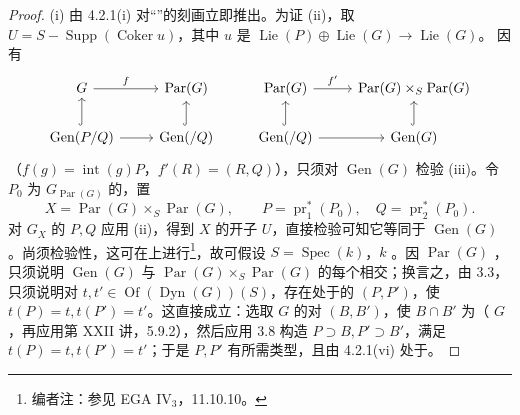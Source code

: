\begin{proof}
(i) 由 4.2.1(i) 对“”的刻画立即推出。为证 (ii)，取 $U=S-\operatorname{Supp}(\operatorname{Coker}u)$，其中 $u$ 是 $\operatorname{Lie}(P)\oplus\operatorname{Lie}(G)\to\operatorname{Lie}(G)$。
因有
\[\begin{tikzcd}
G\arrow[r,"f"]&\operatorname{Par}(G)&\operatorname{Par}(G)\arrow[r,"f'"]&\operatorname{Par}(G)\times_S\operatorname{Par}(G)\\
\operatorname{Gen}(P/Q)\arrow[u,hook]\arrow[r]&\operatorname{Gen}(/Q)\arrow[u,hook]&\operatorname{Gen}(/Q)\arrow[u,hook]\arrow[r]&\operatorname{Gen}(G)\arrow[u,hook]
\end{tikzcd}\]
（$f(g)=\operatorname{int}(g)P$，$f'(R)=(R,Q)$），只须对 $\operatorname{Gen}(G)$ 检验 (iii)。令 $P_0$ 为 $G_{\operatorname{Par}(G)}$ 的，置
\[X=\operatorname{Par}(G)\times_S\operatorname{Par}(G),\qquad P=\operatorname{pr}_1^*(P_0),\quad Q=\operatorname{pr}_2^*(P_0).\]
对 $G_X$ 的 $P,Q$ 应用 (ii)，得到 $X$ 的开子 $U$，直接检验可知它等同于 $\operatorname{Gen}(G)$。尚须检验性，这可在上进行\footnote{编者注：参见 EGA IV$_3$，11.10.10。}，故可假设 $S=\operatorname{Spec}(k)$，$k$ 。因 $\operatorname{Par}(G)$ ，只须说明 $\operatorname{Gen}(G)$ 与 $\operatorname{Par}(G)\times_S\operatorname{Par}(G)$ 的每个相交；换言之，由 3.3，只须说明对 $t,t'\in\operatorname{Of}(\operatorname{Dyn}(G))(S)$，存在处于的 $(P,P')$，使 $t(P)=t,t(P')=t'$。这直接成立：选取 $G$ 的对 $(B,B')$，使 $B\cap B'$ 为（ $G$，再应用第 XXII 讲，5.9.2），然后应用 3.8 构造 $P\supset B,P'\supset B'$，满足 $t(P)=t,t(P')=t'$；于是 $P,P'$ 有所需类型，且由 4.2.1(vi) 处于。
\end{proof}
